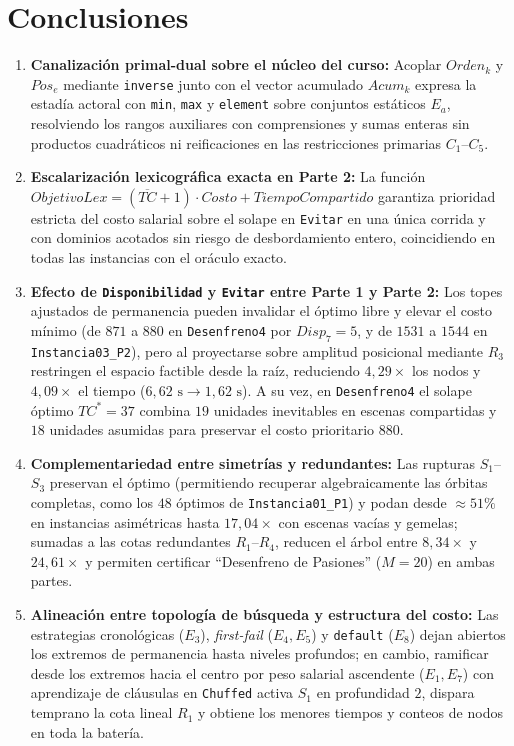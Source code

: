 \section{Conclusiones}
\label{sec:conclusiones}

\begin{enumerate}
    \item \textbf{Canalización primal-dual sobre el núcleo del curso:} Acoplar $Orden_k$ y $Pos_e$ mediante \texttt{inverse} junto con el vector acumulado $Acum_k$ expresa la estadía actoral con \texttt{min}, \texttt{max} y \texttt{element} sobre conjuntos estáticos $E_a$, resolviendo los rangos auxiliares con comprensiones y sumas enteras sin productos cuadráticos ni reificaciones en las restricciones primarias $C_1$--$C_5$.
    \item \textbf{Escalarización lexicográfica exacta en Parte 2:} La función $ObjetivoLex = (\overline{TC} + 1)\cdot Costo + TiempoCompartido$ garantiza prioridad estricta del costo salarial sobre el solape en \texttt{Evitar} en una única corrida y con dominios acotados sin riesgo de desbordamiento entero, coincidiendo en todas las instancias con el oráculo exacto.
    \item \textbf{Efecto de \texttt{Disponibilidad} y \texttt{Evitar} entre Parte 1 y Parte 2:} Los topes ajustados de permanencia pueden invalidar el óptimo libre y elevar el costo mínimo (de $871$ a $880$ en \texttt{Desenfreno4} por $Disp_7 = 5$, y de $1531$ a $1544$ en \texttt{Instancia03\_P2}), pero al proyectarse sobre amplitud posicional mediante $R_3$ restringen el espacio factible desde la raíz, reduciendo $4{,}29\times$ los nodos y $4{,}09\times$ el tiempo ($6{,}62\text{ s} \to 1{,}62\text{ s}$). A su vez, en \texttt{Desenfreno4} el solape óptimo $TC^* = 37$ combina $19$ unidades inevitables en escenas compartidas y $18$ unidades asumidas para preservar el costo prioritario $880$.
    \item \textbf{Complementariedad entre simetrías y redundantes:} Las rupturas $S_1$--$S_3$ preservan el óptimo (permitiendo recuperar algebraicamente las órbitas completas, como los $48$ óptimos de \texttt{Instancia01\_P1}) y podan desde $\approx 51\%$ en instancias asimétricas hasta $17{,}04\times$ con escenas vacías y gemelas; sumadas a las cotas redundantes $R_1$--$R_4$, reducen el árbol entre $8{,}34\times$ y $24{,}61\times$ y permiten certificar ``Desenfreno de Pasiones'' ($M=20$) en ambas partes.
    \item \textbf{Alineación entre topología de búsqueda y estructura del costo:} Las estrategias cronológicas ($E_3$), \emph{first-fail} ($E_4, E_5$) y \texttt{default} ($E_8$) dejan abiertos los extremos de permanencia hasta niveles profundos; en cambio, ramificar desde los extremos hacia el centro por peso salarial ascendente ($E_1, E_7$) con aprendizaje de cláusulas en \texttt{Chuffed} activa $S_1$ en profundidad $2$, dispara temprano la cota lineal $R_1$ y obtiene los menores tiempos y conteos de nodos en toda la batería.
\end{enumerate}
